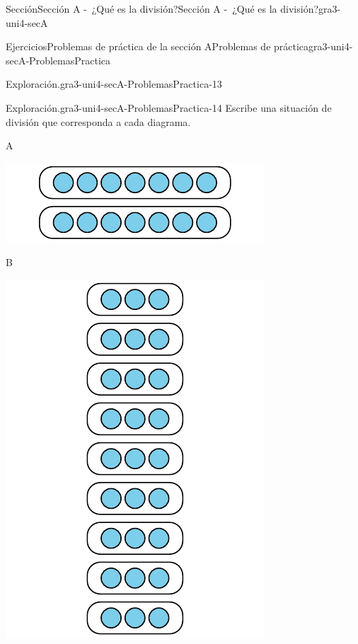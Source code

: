 \documentclass[oneside,10pt,]{article}
\begin{document}
\begin{sectionptx}{Sección}{Sección A -~¿Qué es la división?}{}{Sección A -~¿Qué es la división?}{}{}{gra3-uni4-secA}
\begin{exercises-subsection}{Ejercicios}{Problemas de práctica de la sección A}{}{Problemas de práctica}{}{}{gra3-uni4-secA-ProblemasPractica}
\begin{divisionexercise}{11}{Exploración.}{}{gra3-uni4-secA-ProblemasPractica-13}
\end{divisionexercise}%
\begin{divisionexercise}{12}{Exploración.}{}{gra3-uni4-secA-ProblemasPractica-14}%
Escribe una situación de división que corresponda a cada diagrama.%
\begin{sidebyside}{3}{0}{0}{0.02}%
\begin{sbspanel}{0.32}%
A%
\par
\includegraphics[width=\linewidth]{external/svg-source/tikz-file-151674.pdf}
\end{sbspanel}%
\begin{sbspanel}{0.32}%
B%
\par
\includegraphics[width=\linewidth]{external/svg-source/tikz-file-151675.pdf}

\end{sbspanel}
\end{sidebyside}
\end{divisionexercise}
\end{exercises-subsection}
\end{sectionptx}
\end{document}
